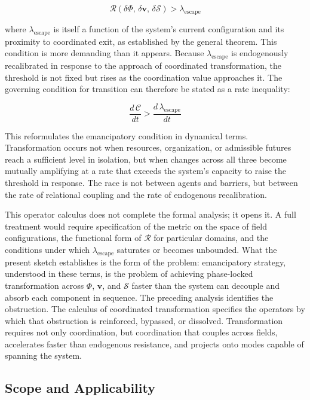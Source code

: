 \documentclass[11pt, a4paper]{article}
\begin{document}
\begin{equation}
\mathcal{R}(\delta\Phi,\, \delta\mathbf{v},\, \delta\mathcal{S}) > \lambda_{\mathrm{escape}}
\end{equation}

where $\lambda_{\mathrm{escape}}$ is itself a function of the system's current configuration and its proximity to coordinated exit, as established by the general theorem. This condition is more demanding than it appears. Because $\lambda_{\mathrm{escape}}$ is endogenously recalibrated in response to the approach of coordinated transformation, the threshold is not fixed but rises as the coordination value approaches it. The governing condition for transition can therefore be stated as a rate inequality:

\begin{equation}
\frac{d\,\mathcal{C}}{dt} > \frac{d\,\lambda_{\mathrm{escape}}}{dt}
\end{equation}

This reformulates the emancipatory condition in dynamical terms. Transformation occurs not when resources, organization, or admissible futures reach a sufficient level in isolation, but when changes across all three become mutually amplifying at a rate that exceeds the system's capacity to raise the threshold in response. The race is not between agents and barriers, but between the rate of relational coupling and the rate of endogenous recalibration.

This operator calculus does not complete the formal analysis; it opens it. A full treatment would require specification of the metric on the space of field configurations, the functional form of $\mathcal{R}$ for particular domains, and the conditions under which $\lambda_{\mathrm{escape}}$ saturates or becomes unbounded. What the present sketch establishes is the form of the problem: emancipatory strategy, understood in these terms, is the problem of achieving phase-locked transformation across $\Phi$, $\mathbf{v}$, and $\mathcal{S}$ faster than the system can decouple and absorb each component in sequence. The preceding analysis identifies the obstruction. The calculus of coordinated transformation specifies the operators by which that obstruction is reinforced, bypassed, or dissolved. Transformation requires not only coordination, but coordination that couples across fields, accelerates faster than endogenous resistance, and projects onto modes capable of spanning the system.

\subsection{Scope and Applicability}
\end{document}
